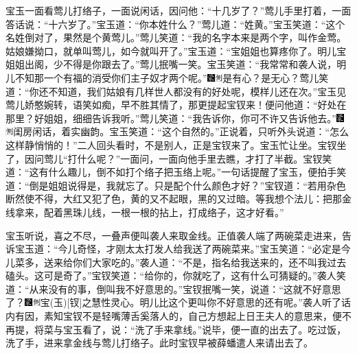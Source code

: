 宝玉一面看莺儿打络子，一面说闲话，因问他：``十几岁了？''莺儿手里打着，一面答话说：``十六岁了。''宝玉道：``你本姓什么？''莺儿道：``姓黄。''宝玉笑道：``这个名姓倒对了，果然是个黄莺儿。''莺儿笑道：``我的名字本来是两个字，叫作金莺。姑娘嫌拗口，就单叫莺儿，如今就叫开了。''宝玉道：``宝姐姐也算疼你了。明儿宝姐姐出阁，少不得是你跟去了。''莺儿抿嘴一笑。宝玉笑道：``我常常和袭人说，明儿不知那一个有福的消受你们主子奴才两个呢。''{\includegraphics[width=3mm]{../Images/00006}\includegraphics[width=3mm]{../Images/00011}\footnotesize \kaishu 是有心？是无心？}莺儿笑道：``你还不知道，我们姑娘有几样世人都没有的好处呢，模样儿还在次。''宝玉见莺儿娇憨婉转，语笑如痴，早不胜其情了，那更提起宝钗来！便问他道：``好处在那里？好姐姐，细细告诉我听。''莺儿笑道：``我告诉你，你可不许又告诉他去。''{\includegraphics[width=3mm]{../Images/00006}\includegraphics[width=3mm]{../Images/00011}\footnotesize \kaishu 闺房闲话，着实幽韵。}宝玉笑道：``这个自然的。''正说着，只听外头说道：``怎么这样静悄悄的！''二人回头看时，不是别人，正是宝钗来了。宝玉忙让坐。宝钗坐了，因问莺儿``打什么呢？''一面问，一面向他手里去瞧，才打了半截。宝钗笑道：``这有什么趣儿，倒不如打个络子把玉络上呢。''一句话提醒了宝玉，便拍手笑道：``倒是姐姐说得是，我就忘了。只是配个什么颜色才好？''宝钗道：``若用杂色断然使不得，大红又犯了色，黄的又不起眼，黑的又过暗。等我想个法儿：把那金线拿来，配着黑珠儿线，一根一根的拈上，打成络子，这才好看。''

宝玉听说，喜之不尽，一叠声便叫袭人来取金线。正值袭人端了两碗菜走进来，告诉宝玉道：``今儿奇怪，才刚太太打发人给我送了两碗菜来。''宝玉笑道：``必定是今儿菜多，送来给你们大家吃的。''袭人道：``不是，指名给我送来的，还不叫我过去磕头。这可是奇了。''宝钗笑道：``给你的，你就吃了，这有什么可猜疑的。''袭人笑道：``从来没有的事，倒叫我不好意思的。''宝钗抿嘴一笑，说道：``这就不好意思了？{\includegraphics[width=3mm]{../Images/00006}\includegraphics[width=3mm]{../Images/00011}\footnotesize \kaishu 宝{(玉)}{[}钗{]}之慧性灵心。}明儿比这个更叫你不好意思的还有呢。''袭人听了话内有因，素知宝钗不是轻嘴薄舌奚落人的，自己方想起上日王夫人的意思来，便不再提，将菜与宝玉看了，说：``洗了手来拿线。''说毕，便一直的出去了。吃过饭，洗了手，进来拿金线与莺儿打络子。此时宝钗早被薛蟠遣人来请出去了。

